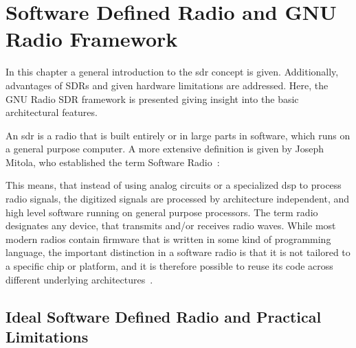\chapter{Software Defined Radio and GNU Radio Framework}\label{sec:sdrgnur}

In this chapter a general introduction to the \gls{sdr} concept is given. Additionally, advantages of SDRs and given hardware limitations are addressed. Here, the GNU Radio SDR framework is presented giving insight into the basic architectural features.

An \gls{sdr} is a radio that is built entirely or in large parts in software, which runs on a general purpose computer. A more extensive definition is given by Joseph Mitola, who established the term Software Radio~\cite{Mitola200609}:



This means, that instead of using analog circuits or a specialized \gls{dsp} to process radio signals, the digitized signals are processed by architecture independent, and high level software running on general purpose processors. The term radio designates any device, that transmits and/or receives radio waves. While most modern radios contain firmware that is written in some kind of programming language, the important distinction in a software radio is that it is not tailored to a specific chip or platform, and it is therefore possible to reuse its code across different underlying architectures~\cite{DABETH}.

\section{Ideal Software Defined Radio and Practical Limitations}\label{sec:sdr}

